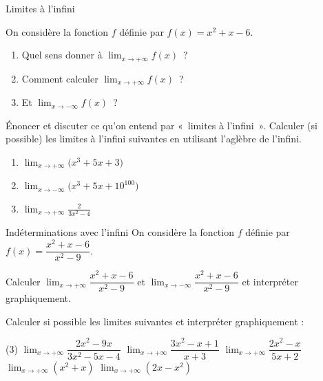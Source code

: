 \documentclass[a4paper,12pt]{article}
\begin{document}
\begin{activite}[label=acti:liminf]
	Limites à l'infini
	\tcblower
	\begin{tasks}
	\task On considère la fonction $f$ définie par $f(x)=x^2+x-6$.
\begin{multicols}{3}
		\begin{enumerate}
\item Quel sens donner à $\displaystyle\lim_{x\to +\infty}f(x)\,$ ?
\item Comment calculer $\displaystyle\lim_{x\to +\infty}f(x)\,$ ?
\item Et $\displaystyle\lim_{x\to -\infty}f(x)\,$ ?
		\end{enumerate}
	\end{multicols}
	\task Énoncer et discuter ce qu'on entend par «~limites à l'infini~».
	\task Calculer (si possible) les limites à l'infini suivantes en utilisant l'aglèbre de l'infini. 

\begin{multicols}{3}
\begin{enumerate}
\item $\displaystyle\lim_{x\to +\infty}\bigl(x^3+5x+3\bigr)$
\item $\displaystyle\lim_{x\to -\infty}\bigl(x^3+5x+10^{100}\bigr)$
\item $\displaystyle\lim_{x\to +\infty}\frac{2}{3x^2-4}$
\end{enumerate}
\end{multicols}
	\end{tasks}
\end{activite}

\begin{activite}[label=acti:indInf]
Indéterminations avec l'infini
\tcblower
On considère la fonction $f$ définie par $f(x) = \dfrac{x^2 + x - 6}{x^2 - 9}$.

Calculer $\displaystyle\lim_{x \to +\infty} \dfrac{x^2 + x - 6}{x^2 - 9}$ et $\displaystyle\lim_{x \to -\infty} \dfrac{x^2 + x - 6}{x^2 - 9}$ et interpréter graphiquement.

Calculer si possible les limites suivantes et interpréter graphiquement :

\begin{tasks}(3)
\task $\displaystyle\lim_{x \to +\infty} \dfrac{2x^2 - 9x}{3x^2 - 5x - 4}$
\task $\displaystyle\lim_{x \to +\infty} \dfrac{3x^2 - x + 1}{x + 3}$
\task $\displaystyle\lim_{x \to +\infty} \dfrac{2x^2 - x}{5x + 2}$
\task $\displaystyle\lim_{x \to +\infty} (x^2 + x)$
\task $\displaystyle\lim_{x \to +\infty} (2x - x^2)$
\end{tasks}
\end{activite}
\end{document}
